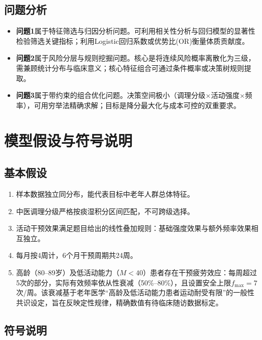 \documentclass[a4paper,12pt]{ctexart}
\begin{document}
\subsection{问题分析}
\begin{itemize}
    \item \textbf{问题1}属于特征筛选与归因分析问题。可利用相关性分析与回归模型的显著性检验筛选关键指标；利用Logistic回归系数或优势比(OR)衡量体质贡献度。
    \item \textbf{问题2}属于风险分层与规则挖掘问题。核心是将连续风险概率离散化为三级，需兼顾统计分布与临床意义；核心特征组合可通过条件概率或决策树规则提取。
    \item \textbf{问题3}属于带约束的组合优化问题。决策空间极小（调理分级$\times$活动强度$\times$频率），可用穷举法精确求解；目标是降分最大化与成本可控的双重要求。
\end{itemize}

\section{模型假设与符号说明}

\subsection{基本假设}
\begin{enumerate}
    \item 样本数据独立同分布，能代表目标中老年人群总体特征。
    \item 中医调理分级严格按痰湿积分区间匹配，不可跨级选择。
    \item 活动干预效果满足题目给出的线性叠加规则：基础强度效果与额外频率效果相互独立。
    \item 每月按4周计，6个月干预周期共24周。
    \item 高龄（80--89岁）及低活动能力（$M<40$）患者存在干预疲劳效应：每周超过5次的部分，实际有效频率依从性衰减（50\%--80\%），且设置安全上限$f_{\max}=7$次/周。该衰减基于老年医学``高龄及低活动能力患者运动耐受有限''的一般性共识设定，旨在反映定性规律，精确数值有待临床随访数据标定。
\end{enumerate}

\subsection{符号说明}
\end{document}
